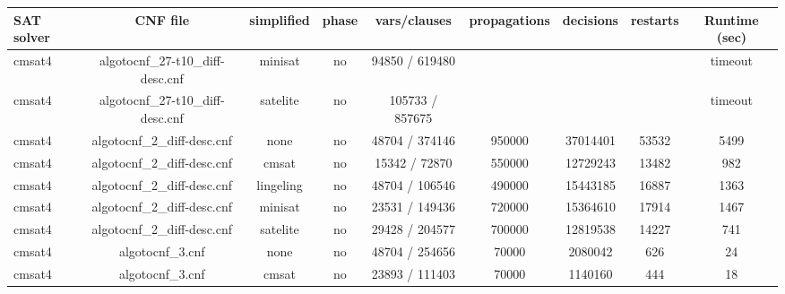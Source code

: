\begin{appendices}
\begin{table}[p]
  \begin{center}
    \begin{tabular}{l|cccccccc}
        \textbf{SAT solver} & \textbf{CNF file} & \textbf{simplified} & \textbf{phase} & \textbf{vars/clauses} & \textbf{propagations} & \textbf{decisions} & \textbf{restarts} & \textbf{Runtime (sec)} \\
      \hline
  cmsat4                         & algotocnf\_27-t10\_diff-desc.cnf & minisat    & no    & 94850 / 619480 &           &           &            & timeout \\ %
  cmsat4                         & algotocnf\_27-t10\_diff-desc.cnf & satelite   & no    & 105733 / 857675 &           &           &            & timeout \\ %
  cmsat4                         & algotocnf\_2\_diff-desc.cnf    & none       & no    & 48704 / 374146 & 950000    & 37014401  & 53532      & 5499 \\ %
  cmsat4                         & algotocnf\_2\_diff-desc.cnf    & cmsat      & no    & 15342 / 72870 & 550000    & 12729243  & 13482      & 982 \\ %
  cmsat4                         & algotocnf\_2\_diff-desc.cnf    & lingeling  & no    & 48704 / 106546 & 490000    & 15443185  & 16887      & 1363 \\ %
  cmsat4                         & algotocnf\_2\_diff-desc.cnf    & minisat    & no    & 23531 / 149436 & 720000    & 15364610  & 17914      & 1467 \\ %
  cmsat4                         & algotocnf\_2\_diff-desc.cnf    & satelite   & no    & 29428 / 204577 & 700000    & 12819538  & 14227      & 741 \\ %
  cmsat4                         & algotocnf\_3.cnf               & none       & no    & 48704 / 254656 & 70000     & 2080042   & 626        & 24 \\ %
  cmsat4                         & algotocnf\_3.cnf               & cmsat      & no    & 23893 / 111403 & 70000     & 1140160   & 444        & 18 \\ %

\end{tabular}
\end{center}
\end{table}
\end{appendices}
